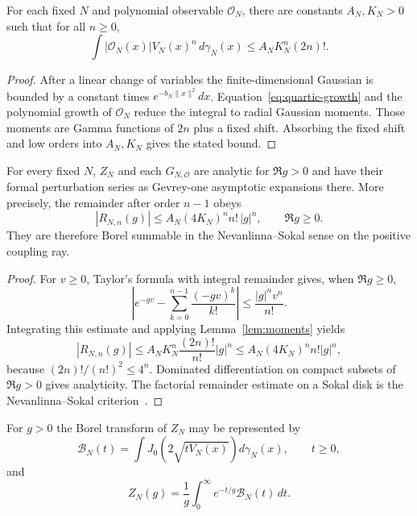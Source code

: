 \documentclass[11pt]{article}
\begin{document}
\begin{lemma}\label{lem:moments}
For each fixed $N$ and polynomial observable $\mathcal O_N$, there are constants
$A_N,K_N>0$ such that for all $n\geq0$,
\[
 \int |\mathcal O_N(x)|V_N(x)^n\,d\gamma_N(x)
 \leq A_NK_N^n(2n)!.
\]
\end{lemma}

\begin{proof}
After a linear change of variables the finite-dimensional Gaussian is bounded by a
constant times $e^{-b_N\|x\|^2}dx$. Equation~\eqref{eq:quartic-growth} and the
polynomial growth of $\mathcal O_N$ reduce the integral to radial Gaussian moments.
Those moments are Gamma functions of $2n$ plus a fixed shift. Absorbing the fixed
shift and low orders into $A_N,K_N$ gives the stated bound.
\end{proof}

\begin{theorem}\label{thm:finite-borel}
For every fixed $N$, $Z_N$ and each $G_{N,\mathcal O}$ are analytic for
$\Re g>0$ and have their formal perturbation series as Gevrey-one asymptotic
expansions there. More precisely, the remainder after order $n-1$ obeys
\[
 |R_{N,n}(g)|\leq A_N(4K_N)^n n!\,|g|^n,
 \qquad \Re g\geq0.
\]
They are therefore Borel summable in the Nevanlinna--Sokal sense on the positive
coupling ray.
\end{theorem}

\begin{proof}
For $v\geq0$, Taylor's formula with integral remainder gives, when $\Re g\geq0$,
\[
 \left|e^{-gv}-\sum_{k=0}^{n-1}\frac{(-gv)^k}{k!}\right|
 \leq \frac{|g|^nv^n}{n!}.
\]
Integrating this estimate and applying Lemma~\ref{lem:moments} yields
\[
 |R_{N,n}(g)|\leq A_NK_N^n\frac{(2n)!}{n!}|g|^n
 \leq A_N(4K_N)^nn!|g|^n,
\]
because $(2n)!/(n!)^2\leq4^n$. Dominated differentiation on compact subsets of
$\Re g>0$ gives analyticity. The factorial remainder estimate on a Sokal disk is
the Nevanlinna--Sokal criterion~\cite{Sokal1980}.
\end{proof}

\begin{corollary}\label{cor:bessel}
For $g>0$ the Borel transform of $Z_N$ may be represented by
\[
 \mathcal B_N(t)=
 \int J_0\!\left(2\sqrt{tV_N(x)}\right)d\gamma_N(x),\qquad t\geq0,
\]
and
\[
 Z_N(g)=\frac1g\int_0^\infty e^{-t/g}\mathcal B_N(t)\,dt.
\]
\end{corollary}
\end{document}
